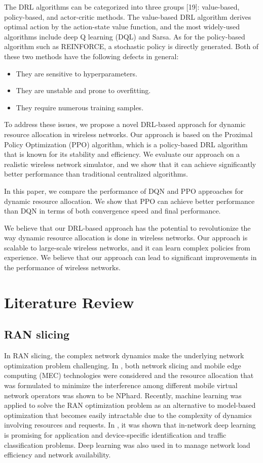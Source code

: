 \documentclass[conference]{IEEEtran}
\begin{document}
The DRL algorithms can be categorized into three groups [19]: value-based, policy-based, and actor-critic methods. The value-based DRL algorithm derives optimal action by the action-state value function, and the most widely-used algorithms include deep Q learning (DQL) and Sarsa. As for the policy-based algorithm such as REINFORCE, a stochastic policy is directly generated. Both of these two methods have the following defects in general:

\begin{itemize}
    \item They are sensitive to hyperparameters.
    \item They are unstable and prone to overfitting.
    \item They require numerous training samples.
\end{itemize}

To address these issues, we propose a novel DRL-based approach for dynamic resource allocation in wireless networks. Our approach is based on the Proximal Policy Optimization (PPO) algorithm, which is a policy-based DRL algorithm that is known for its stability and efficiency. We evaluate our approach on a realistic wireless network simulator, and we show that it can achieve significantly better performance than traditional centralized algorithms.

In this paper, we compare the performance of DQN and PPO approaches for dynamic resource allocation. We show that PPO can achieve better performance than DQN in terms of both convergence speed and final performance.

We believe that our DRL-based approach has the potential to revolutionize the way dynamic resource allocation is done in wireless networks. Our approach is scalable to large-scale wireless networks, and it can learn complex policies from experience. We believe that our approach can lead to significant improvements in the performance of wireless networks.

\section{Literature Review}

\subsection{RAN slicing}
In RAN slicing, the complex network dynamics make the underlying network optimization problem challenging. In \cite{abdelhadi2016optimal}, both network slicing and mobile edge computing (MEC) technologies were considered and the resource allocation that was formulated to minimize the interference among different mobile virtual network operators was shown to be NPhard. Recently, machine learning was applied to solve the RAN optimization problem as an alternative to model-based optimization that becomes easily intractable due to the complexity of dynamics involving resources and requests. In \cite{lee2019resource}, it was shown that in-network deep learning is promising for application and device-specific identification and traffic classification problems. Deep learning was also used in \cite{rahimi2022novel} to manage network load efficiency and network availability. 
\end{document}
